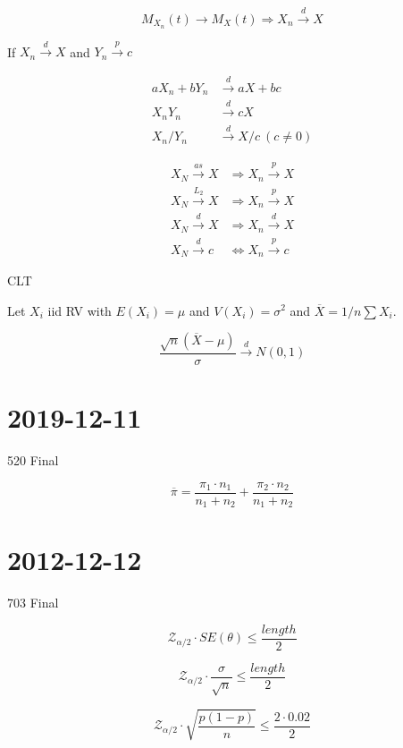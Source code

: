 \documentclass[]{article}
\begin{document}
$$
M_{X_n}(t) \rightarrow M_X(t) \Rightarrow X_n \stackrel{d}{\rightarrow} X
$$



If $X_n \stackrel{d}{\rightarrow}X$ and $Y_n \stackrel{p}{\rightarrow}c$

\begin{align*}
aX_n + bY_n & \stackrel{d}{\rightarrow} aX + bc \\
X_n Y_n & \stackrel{d}{\rightarrow} cX \\
X_n / Y_n & \stackrel{d}{\rightarrow} X / c \ (c \neq 0)
\end{align*}



\begin{align*}
X_N \stackrel{as}{\rightarrow} X & \Rightarrow X_n \stackrel{p}{\rightarrow} X \\
X_N \stackrel{L_2}{\rightarrow} X & \Rightarrow X_n \stackrel{p}{\rightarrow} X \\
X_N \stackrel{d}{\rightarrow} X & \Rightarrow X_n \stackrel{d}{\rightarrow} X \\
X_N \stackrel{d}{\rightarrow}c & \Leftrightarrow X_n \stackrel{p}{\rightarrow} c
\end{align*}




CLT

\noindent
Let $X_i$ iid RV with $E(X_i) = \mu$ and $V(X_i) = \sigma^2$ and $\overline{ X } = 1/n \sum X_i$.

$$
\frac{ \sqrt{ n} (\overline{ X } - \mu) } { \sigma } \stackrel{d}{\rightarrow} N(0,1)
$$




\section*{2019-12-11}

520 Final

$$
\overline{ \pi } = \frac{ \pi_1 \cdot n_1 }{ n_1 + n_2 } + \frac{ \pi_2 \cdot n_2  }{ n_1 + n_2 }
$$


\section*{2012-12-12}

703 Final

$$
\mathcal{Z}_{\alpha/2} \cdot SE(\theta) \leq \frac{ length}{ 2 }
$$



$$
\mathcal{Z}_{\alpha/2} \cdot \frac{ \sigma }{ \sqrt{ {n} } } \leq \frac{ length}{ 2 }
$$


$$
\mathcal{Z}_{\alpha/2} \cdot \sqrt{ \frac{ p(1-p) }{ n }} \leq \frac{ 2\cdot 0.02 }{ 2 }
$$
\end{document}
